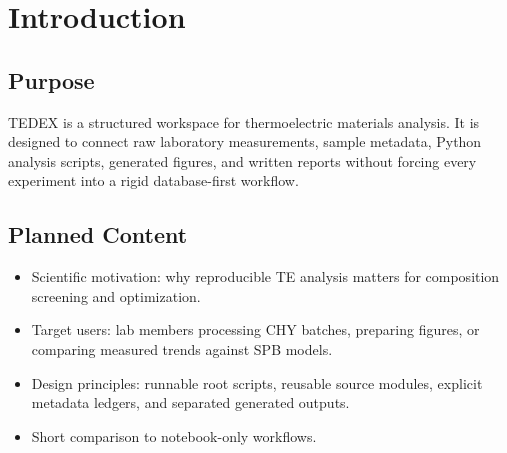 \chapter{Introduction}

\section{Purpose}

TEDEX is a structured workspace for thermoelectric materials analysis. It is
designed to connect raw laboratory measurements, sample metadata, Python
analysis scripts, generated figures, and written reports without forcing every
experiment into a rigid database-first workflow.

\section{Planned Content}

\begin{itemize}[leftmargin=*]
  \item Scientific motivation: why reproducible TE analysis matters for
  composition screening and optimization.
  \item Target users: lab members processing CHY batches, preparing figures, or
  comparing measured trends against SPB models.
  \item Design principles: runnable root scripts, reusable source modules,
  explicit metadata ledgers, and separated generated outputs.
  \item Short comparison to notebook-only workflows.
\end{itemize}

